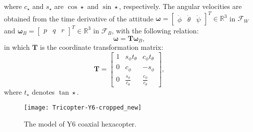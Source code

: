 where $c_{\star}$ and $s_{\star}$ are $\cos\star$ and $\sin\star$, respectively. The angular velocities are obtained from the time derivative of the attitude $\boldsymbol{\omega} = \begin{bmatrix}\dot{\phi} & \dot{\theta} & \dot{\psi}\end{bmatrix}^T \in \mathbb{R}^3$ in $\mathcal{F}_W$ and $\boldsymbol{\omega}_B = \begin{bmatrix} p & q & r \end{bmatrix}^{T} \in \mathbb{R}^3$ in $\mathcal{F}_B$, with the following relation:
\begin{equation}
\boldsymbol{\omega} = \mathbf{T} \boldsymbol{\omega}_B,
\label{eq:angular_velocity_transformation}
\end{equation}
in which $\mathbf{T}$ is the coordinate transformation matrix:
\begin{equation}
\mathbf{T} = \begin{bmatrix} 1 & s_{\phi} t_{\theta} & c_{\phi} t_{\theta} \\ 0 & c_{\phi} & -s_{\phi} \\ 0 & \frac{s_{\phi}}{c_{\theta}} & \frac{c_{\phi}}{c_{\theta}} \end{bmatrix},
\end{equation}
where $t_{\star}$ denotes $\tan\star$.

\begin{figure}[!b]
\centering
\texttt{[image: Tricopter-Y6-cropped\_new]}
\caption{The model of Y6 coaxial hexacopter.}
\label{fig:tricopter}
\end{figure}

